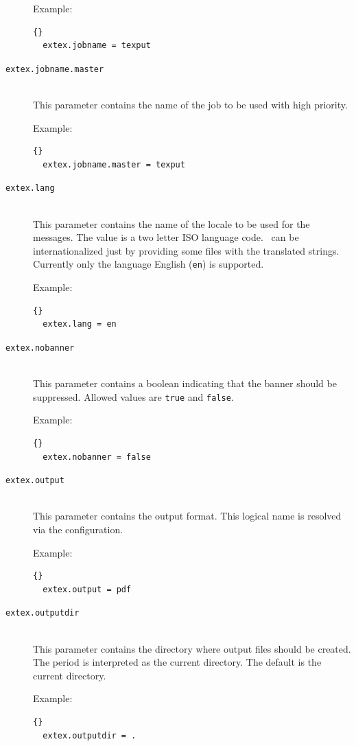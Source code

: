 \documentclass{extex-doc}
\makeatletter
\newcommand\Property[1]{\texttt{#1}\index{#1@\texttt{#1}}}
\makeatother
\begin{document}
\begin{description}
  Example:
\begin{lstlisting}{}
  extex.jobname = texput
\end{lstlisting}

\item[\Property{extex.jobname.master}]\ \\
  This parameter contains the name of the job to be used with high
  priority.

  Example:
\begin{lstlisting}{}
  extex.jobname.master = texput
\end{lstlisting}

\item[\Property{extex.lang}]\ \\
  This parameter contains the name of the locale to be used for the
  messages. The value is a two letter ISO language code.  \ExTeX\ can
  be internationalized just by providing some files with the translated
  strings. Currently only the language English (\verb|en|) is
  supported.

  Example:
\begin{lstlisting}{}
  extex.lang = en
\end{lstlisting}

\item[\Property{extex.nobanner}]\ \\
  This parameter contains a boolean indicating that the banner should
  be suppressed. Allowed values are \verb|true| and \verb|false|.

  Example:
\begin{lstlisting}{}
  extex.nobanner = false
\end{lstlisting}


\item[\Property{extex.output}]\ \\
  This parameter contains the output format. This logical name is
  resolved via the configuration.

  Example:
\begin{lstlisting}{}
  extex.output = pdf
\end{lstlisting}

\item[\Property{extex.outputdir}]\ \\
  This parameter contains the directory where output files should be
  created. The period is interpreted as the current directory. The
  default is the current directory.

  Example:
\begin{lstlisting}{}
  extex.outputdir = .
\end{lstlisting}


\end{description}
\end{document}
